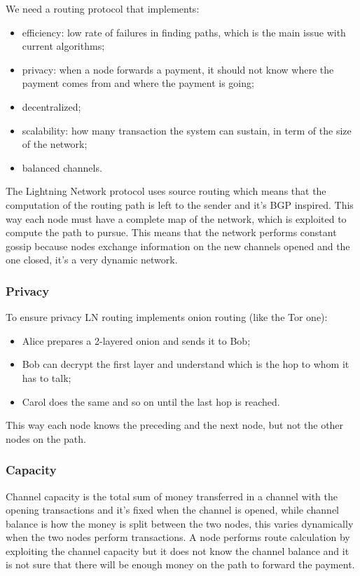 We need a routing protocol that implements:
\begin{itemize}
    \item efficiency: low rate of failures in finding paths, which is the main issue with current algorithms;
    \item privacy: when a node forwards a payment, it should not know where the payment comes from and where the payment is going;
    \item decentralized;
    \item scalability: how many transaction the system can sustain, in term of the size of the network;
    \item balanced channels.
\end{itemize}

The Lightning Network protocol uses source routing which means that the computation of the routing path is left to the sender and it's BGP inspired.
This way each node must have a complete map of the network, which is exploited to compute the path to pursue.
This means that the network performs constant gossip because nodes exchange information on the new channels opened and the one closed, it's a very dynamic network.

\subsubsection{Privacy}
To ensure privacy LN routing implements onion routing (like the Tor one):
\begin{itemize}
    \item Alice prepares a 2-layered onion and sends it to Bob;
    \item Bob can decrypt the first layer and understand which is the hop to whom it has to talk;
    \item Carol does the same and so on until the last hop is reached.
\end{itemize}
This way each node knows the preceding and the next node, but not the other nodes on the path.

\subsubsection{Capacity}
Channel capacity is the total sum of money transferred in a channel with the opening transactions and it's fixed when the channel is opened, while channel balance is how the money is split between the two nodes, this varies dynamically when the two nodes perform transactions.
A node performs route calculation by exploiting the channel capacity but it does not know the channel balance and it is not sure that there will be enough money on the path to forward the payment.

